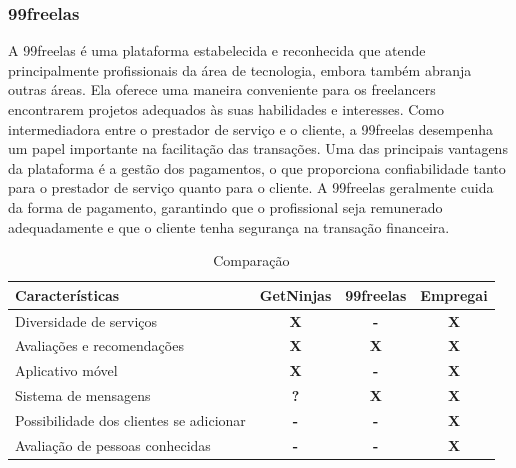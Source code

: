\subsubsection{99freelas}
A 99freelas é uma plataforma estabelecida e reconhecida que atende principalmente profissionais da área de tecnologia, embora também abranja
outras áreas. Ela oferece uma maneira conveniente para os freelancers encontrarem projetos adequados às suas habilidades e interesses.
Como intermediadora entre o prestador de serviço e o cliente, a 99freelas desempenha um papel importante na facilitação das transações.
Uma das principais vantagens da plataforma é a gestão dos pagamentos, o que proporciona confiabilidade tanto para o prestador de serviço 
quanto para o cliente. A 99freelas geralmente cuida da forma de pagamento, garantindo que o profissional seja remunerado adequadamente e 
que o cliente tenha segurança na transação financeira.

\begin{table}[htb]
    \centering
    \caption{Comparação}
    \label{tab:comparação}
\begin{tabular}{|p{5cm}|p{2cm}|p{2cm}|p{2cm}|}
    \hline
    \textbf{Características} & \textbf{GetNinjas} & \textbf{99freelas} & \textbf{Empregai}  \\ \hline
    Diversidade de serviços   & \multicolumn{1}{c|}{\textbf{X}}   & \multicolumn{1}{c|}{\textbf{-}}  & \multicolumn{1}{c|}{\textbf{X}} \\ \hline
	Avaliações e recomendações   & \multicolumn{1}{c|}{\textbf{X}}   & \multicolumn{1}{c|}{\textbf{X}}  & \multicolumn{1}{c|}{\textbf{X}} \\ \hline
    Aplicativo móvel   & \multicolumn{1}{c|}{\textbf{X}}   & \multicolumn{1}{c|}{\textbf{-}}  & \multicolumn{1}{c|}{\textbf{X}} \\ \hline
    Sistema de mensagens   & \multicolumn{1}{c|}{\textbf{?}}   & \multicolumn{1}{c|}{\textbf{X}}  & \multicolumn{1}{c|}{\textbf{X }} \\ \hline
    Possibilidade dos clientes se adicionar   & \multicolumn{1}{c|}{\textbf{-}}   & \multicolumn{1}{c|}{\textbf{-}}  & \multicolumn{1}{c|}{\textbf{X}} \\ \hline
	Avaliação de pessoas conhecidas   & \multicolumn{1}{c|}{\textbf{-}}   & \multicolumn{1}{c|}{\textbf{-}}  & \multicolumn{1}{c|}{\textbf{X}} \\ \hline
\end{tabular}
\end{table}

